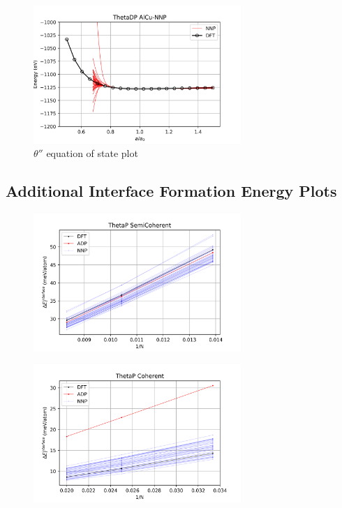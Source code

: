\documentclass{article}
\begin{document}
\begin{figure}[H]%
\centering%
\includegraphics[width=0.7\textwidth,center]{figures/EOS_AlCu-NNP_ThetaDP.png}%
\caption{$\theta''$ equation of state plot}%
\end{figure}

\subsection{Additional Interface Formation Energy Plots} \label{sct:add_interface}

\begin{figure}[H]%
\centering%
\includegraphics[width=0.7\textwidth,center]{figures/InterfaceSlope_ThetaP_SemiCoherent.png}%
\end{figure}

\begin{figure}[H]%
\centering%
\includegraphics[width=0.7\textwidth,center]{figures/InterfaceSlope_ThetaP_Coherent.png}%
\end{figure}
\end{document}
